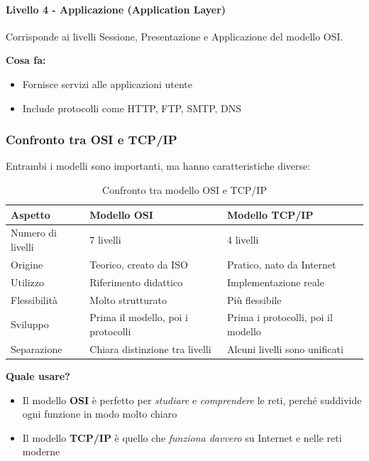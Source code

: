 \documentclass[12pt,a4paper]{article}
\begin{document}
\paragraph{Livello 4 - Applicazione (Application Layer)}
Corrisponde ai livelli Sessione, Presentazione e Applicazione del modello OSI.

\textbf{Cosa fa:}
\begin{itemize}
    \item Fornisce servizi alle applicazioni utente
    \item Include protocolli come HTTP, FTP, SMTP, DNS
\end{itemize}

\subsubsection{Confronto tra OSI e TCP/IP}

Entrambi i modelli sono importanti, ma hanno caratteristiche diverse:

\begin{table}[h]
\centering
\begin{tabular}{|p{4cm}|p{5cm}|p{5cm}|}
\hline
\textbf{Aspetto} & \textbf{Modello OSI} & \textbf{Modello TCP/IP} \\
\hline
Numero di livelli & 7 livelli & 4 livelli \\
\hline
Origine & Teorico, creato da ISO & Pratico, nato da Internet \\
\hline
Utilizzo & Riferimento didattico & Implementazione reale \\
\hline
Flessibilità & Molto strutturato & Più flessibile \\
\hline
Sviluppo & Prima il modello, poi i protocolli & Prima i protocolli, poi il modello \\
\hline
Separazione & Chiara distinzione tra livelli & Alcuni livelli sono unificati \\
\hline
\end{tabular}
\caption{Confronto tra modello OSI e TCP/IP}
\end{table}

\vspace{0.5cm}
\noindent
\textbf{Quale usare?}
\begin{itemize}
    \item Il modello \textbf{OSI} è perfetto per \textit{studiare} e \textit{comprendere} le reti, perché suddivide ogni funzione in modo molto chiaro
    \item Il modello \textbf{TCP/IP} è quello che \textit{funziona davvero} su Internet e nelle reti moderne
\end{itemize}
\end{document}
